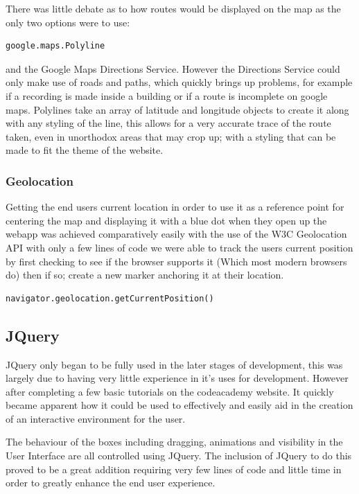 \documentclass{l3proj}
\begin{document}
There was little debate as to how routes would be displayed on the map as the only two options were to use:
\begin{verbatim}
google.maps.Polyline
\end{verbatim}
and the Google Maps Directions Service. However the Directions Service could only make use of roads and paths, which quickly brings up problems, for example if a recording is made inside a building or if a route is incomplete on google maps. Polylines take an array of latitude and longitude objects to create it along with any styling of the line, this allows for a very accurate trace of the route taken, even in unorthodox areas that may crop up; with a styling that can be made to fit the theme of the website.

\subsubsection{Geolocation}

Getting the end users current location in order to use it as a reference point for centering the map and displaying it with a blue dot when they open up the webapp was achieved comparatively easily with the use of the W3C Geolocation API with only a few lines of code we were able to track the users current position by first checking to see if the browser supports it (Which most modern browsers do) then if so; create a new marker anchoring it at their location.
\begin{verbatim}
navigator.geolocation.getCurrentPosition()
\end{verbatim}

\subsection{JQuery}
JQuery only began to be fully used in the later stages of development, this was largely due to having very little experience in it's uses for development. However after completing a few basic tutorials on the codeacademy website. It quickly became apparent how it could be used to effectively and easily aid in the creation of an interactive environment for the user.

The behaviour of the boxes including dragging, animations and visibility in the User Interface are all controlled using JQuery. The inclusion of
JQuery to do this proved to be a great addition requiring very few lines of code and little time in order to greatly enhance the end user experience.
\end{document}
